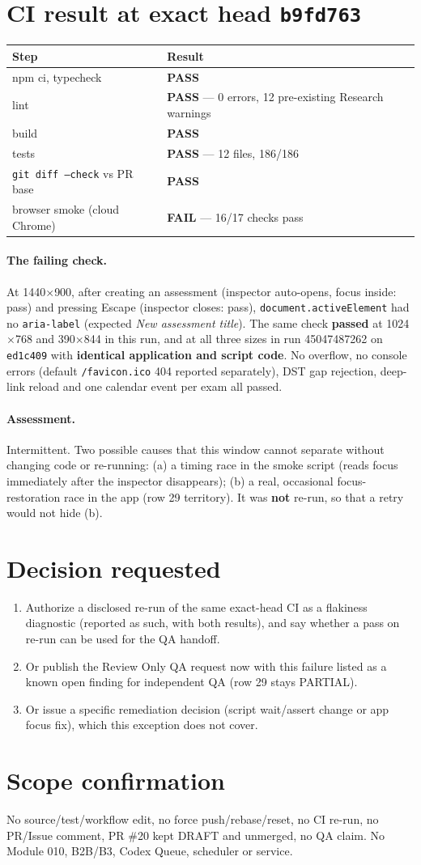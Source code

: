 \documentclass[11pt,a4paper]{article}
\newcommand{\sha}[1]{\texttt{\small #1}}
\newcommand{\PASS}{\textcolor{green!50!black}{\textbf{PASS}}}
\newcommand{\FAIL}{\textcolor{red!70!black}{\textbf{FAIL}}}
\begin{document}
\section{CI result at exact head \sha{b9fd763}}
\begin{tabularx}{\textwidth}{@{}Xl@{}}
\toprule
Step & Result \\
\midrule
npm ci, typecheck & \PASS \\
lint & \PASS{} --- 0 errors, 12 pre-existing Research warnings \\
build & \PASS \\
tests & \PASS{} --- 12 files, 186/186 \\
\texttt{git diff --check} vs PR base & \PASS \\
browser smoke (cloud Chrome) & \FAIL{} --- 16/17 checks pass \\
\bottomrule
\end{tabularx}

\paragraph{The failing check.} At 1440$\times$900, after creating an assessment (inspector auto-opens, focus inside: pass) and pressing Escape (inspector closes: pass), \texttt{document.activeElement} had no \texttt{aria-label} (expected \emph{New assessment title}). The same check \textbf{passed} at 1024$\times$768 and 390$\times$844 in this run, and at all three sizes in run 45047487262 on \sha{ed1c409} with \textbf{identical application and script code}. No overflow, no console errors (default \texttt{/favicon.ico} 404 reported separately), DST gap rejection, deep-link reload and one calendar event per exam all passed.

\paragraph{Assessment.} Intermittent. Two possible causes that this window cannot separate without changing code or re-running: (a) a timing race in the smoke script (reads focus immediately after the inspector disappears); (b) a real, occasional focus-restoration race in the app (row 29 territory). It was \textbf{not} re-run, so that a retry would not hide (b).

\section{Decision requested}
\begin{enumerate}
  \item Authorize a disclosed re-run of the same exact-head CI as a flakiness diagnostic (reported as such, with both results), and say whether a pass on re-run can be used for the QA handoff.
  \item Or publish the Review Only QA request now with this failure listed as a known open finding for independent QA (row 29 stays PARTIAL).
  \item Or issue a specific remediation decision (script wait/assert change or app focus fix), which this exception does not cover.
\end{enumerate}

\section{Scope confirmation}
No source/test/workflow edit, no force push/rebase/reset, no CI re-run, no PR/Issue comment, PR \#20 kept DRAFT and unmerged, no QA claim. No Module 010, B2B/B3, Codex Queue, scheduler or service.
\end{document}

